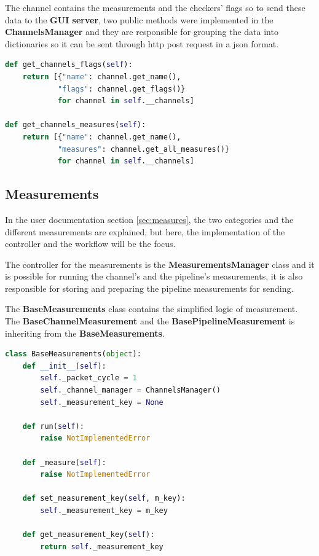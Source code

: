 The channel contains the measurements and the checkers' flags so to send these data
to the \textbf{GUI server}, two public methods were implemented in the \textbf{ChannelsManager}
and they are responsible for grouping the data into dictionaries so it can be sent through http 
post request in a json format.
\newline
\begin{lstlisting}[language=Python, caption={Data grouping methods},captionpos=b]
def get_channels_flags(self):
	return [{"name": channel.get_name(),
			"flags": channel.get_flags()}
			for channel in self.__channels]
	
def get_channels_measures(self):
	return [{"name": channel.get_name(),
			"measures": channel.get_all_measures()}
			for channel in self.__channels]
\end{lstlisting}

\subsection{Measurements}
In the user documentation section \ref{sec:measures}, the two categories and the different measurements
are explained, but here, the implementation of the controller and the workflow will be the focus.

The controller for the measurements is the \textbf{MeasurementsManager} class and it is possible for running
the channel's and the pipeline's measurements, it is also responsible for storing and preparing the pipeline
measurements for sending.

The \textbf{BaseMeasurements} class contains the simplified logic of measurement. The \textbf{BaseChannelMeasurement}
and the \textbf{BasePipelineMeasurement} is inheriting from the \textbf{BaseMeasurements}.
\newline
\begin{lstlisting}[language=Python, caption={BaseMeasurements implementation},captionpos=b]
class BaseMeasurements(object):
    def __init__(self):
        self._packet_cycle = 1
        self._channel_manager = ChannelsManager()
        self._measurement_key = None

    def run(self):
        raise NotImplementedError
    
    def _measure(self):
        raise NotImplementedError

    def set_measurement_key(self, m_key):
        self._measurement_key = m_key

    def get_measurement_key(self):
        return self._measurement_key
\end{lstlisting}

